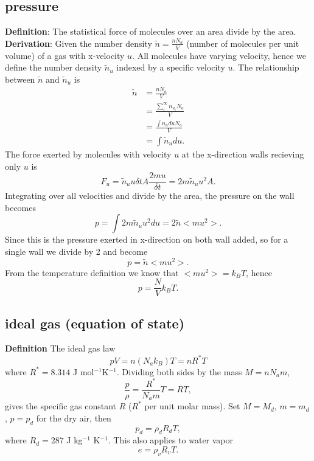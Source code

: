 \subsection{pressure}
{\bf Definition}: The statistical force of molecules over an area divide by the area. \\
{\bf Derivation}: Given the number density $\tilde{n} = \frac{n N_a}{V}$ (number of molecules per
unit volume) of a gas with x-velocity $u$. All molecules have varying velocity, hence we define the
number density $\tilde{n}_u$ indexed by a specific velocity $u$. The relationship between
$\tilde{n}$ and $\tilde{n}_u$ is
\begin{equation}
\begin{aligned}
   \tilde{n} & = \frac{n N_a}{V} \\
             & = \frac{\sum_{i}^\infty n_{u_i} N_a}{V} \\
             & = \frac{\int n_{u} du N_a}{V} \\
             & = \int \tilde{n}_u du.
\end{aligned}
\end{equation}
The force exerted by molecules with velocity $u$ at the x-direction walls recieving only $u$ is
\begin{equation}
   F_u = \tilde{n}_u u\delta t A \frac{2m u}{\delta t} = 2m\tilde{n}_u u^2 A.
\end{equation}
Integrating over all velocities and divide by the area, the pressure on the wall becomes
\begin{equation}
   p = \int 2m\tilde{n}_u u^2du = 2 \tilde{n} <m u^2>.
\end{equation}
Since this is the pressure exerted in x-direction on both wall added, so for a single wall we divide
by 2 and become 
\begin{equation}
   p = \tilde{n} <m u^2>.
\end{equation}
From the temperature definition we know that $<m u^2>=k_BT$, hence
\begin{equation}
   p = \frac{N}{V}k_B T.
\end{equation}


\subsection{ideal gas (equation of state)}
{\bf Definition} The ideal gas law 
\begin{equation}
   p V = n (N_a k_B) T = n R^* T
\end{equation}
where $R^* = 8.314$ J mol$^{-1}$K$^{-1}$. Dividing both sides by the mass $M = n N_a m$,
\begin{equation}
   \frac{p}{\rho} = \frac{R^*}{N_a m} T = R T,
\end{equation}
gives the specific gas constant $R$ ($R^*$ per unit molar mass). Set $M=M_d$, $m=m_d$, $p=p_d$ for the dry air, then 
\begin{equation}
   p_d = \rho_d R_d T,
\end{equation}
where $R_d = 287$ J kg$^{-1}$ K$^{-1}$. This also applies to water vapor
\begin{equation}
   e = \rho_v R_v T.
\end{equation}

